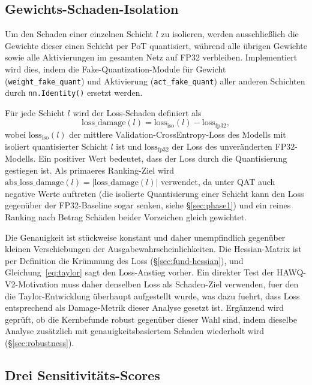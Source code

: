 \subsection{Gewichts-Schaden-Isolation}
\label{sec:isolation}

Um den Schaden einer einzelnen Schicht $l$ zu isolieren, werden ausschließlich die Gewichte dieser einen Schicht per PoT quantisiert, während alle übrigen Gewichte sowie alle Aktivierungen im gesamten Netz auf FP32 verbleiben. Implementiert wird dies, indem die Fake-Quantization-Module für Gewicht (\texttt{weight\_fake\_quant}) und Aktivierung (\texttt{act\_fake\_quant}) aller anderen Schichten durch \texttt{nn.Identity()} ersetzt werden.
\par\medskip

Für jede Schicht $l$ wird der Loss-Schaden definiert als
\begin{equation}
\mathrm{loss\_damage}(l) = \mathrm{loss}_{\mathrm{iso}}(l) - \mathrm{loss}_{\mathrm{fp32}},
\label{eq:loss-damage}
\end{equation}
wobei $\mathrm{loss}_{\mathrm{iso}}(l)$ der mittlere Validation-CrossEntropy-Loss des Modells mit isoliert quantisierter Schicht $l$ ist und $\mathrm{loss}_{\mathrm{fp32}}$ der Loss des unveränderten FP32-Modells. Ein positiver Wert bedeutet, dass der Loss durch die Quantisierung gestiegen ist. Als primaeres Ranking-Ziel wird $\mathrm{abs\_loss\_damage}(l) = |\mathrm{loss\_damage}(l)|$ verwendet, da unter QAT auch negative Werte auftreten (die isolierte Quantisierung einer Schicht kann den Loss gegenüber der FP32-Baseline sogar senken, siehe \S\ref{sec:phase1}) und ein reines Ranking nach Betrag Schäden beider Vorzeichen gleich gewichtet.
\par\medskip

Die Genauigkeit ist stückweise konstant und daher unempfindlich gegenüber kleinen Verschiebungen der Ausgabewahrscheinlichkeiten. Die Hessian-Matrix ist per Definition die Krümmung des Loss (\S\ref{sec:fund-hessian}), und Gleichung~\eqref{eq:taylor} sagt den Loss-Anstieg vorher. Ein direkter Test der HAWQ-V2-Motivation muss daher denselben Loss als Schaden-Ziel verwenden, fuer den die Taylor-Entwicklung überhaupt aufgestellt wurde, was dazu fuehrt, dass Loss entsprechend als Damage-Metrik dieser Analyse gesetzt ist. Ergänzend wird geprüft, ob die Kernbefunde robust gegenüber dieser Wahl sind, indem dieselbe Analyse zusätzlich mit genauigkeitsbasiertem Schaden wiederholt wird (\S\ref{sec:robustness}).

\subsection{Drei Sensitivitäts-Scores}
\label{sec:scores}

